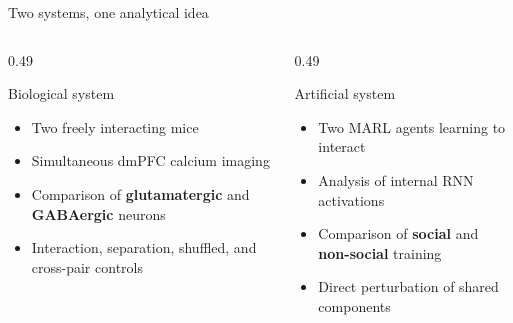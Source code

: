 \documentclass[aspectratio=169,11pt]{beamer}
\begin{document}
\begin{frame}{Two systems, one analytical idea}
\begin{columns}[T]
  \begin{column}{0.49\textwidth}
    \begin{block}{Biological system}
    \begin{itemize}
      \item Two freely interacting mice
      \item Simultaneous dmPFC calcium imaging
      \item Comparison of \textbf{glutamatergic} and \textbf{GABAergic} neurons
      \item Interaction, separation, shuffled, and cross-pair controls
    \end{itemize}
    \end{block}
  \end{column}
  \begin{column}{0.49\textwidth}
    \begin{block}{Artificial system}
    \begin{itemize}
      \item Two MARL agents learning to interact
      \item Analysis of internal RNN activations
      \item Comparison of \textbf{social} and \textbf{non-social} training
      \item Direct perturbation of shared components
    \end{itemize}
    \end{block}
  \end{column}
\end{columns}
\vspace{0.3em}
\begin{center}
\end{center}
\end{frame}
\end{document}
